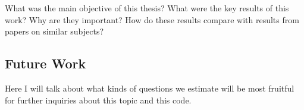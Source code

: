 \documentclass[11pt]{article}
\begin{document}
What was the main objective of this thesis? What were the key results of this work? Why are they important? How do these results compare with results from papers on similar subjects?

\begin{centering}
\subsection{Future Work}
\end{centering}

Here I will talk about what kinds of questions we estimate will be most fruitful for further inquiries about this topic and this code.

 {
    \printbibliography
}
\end{document}
